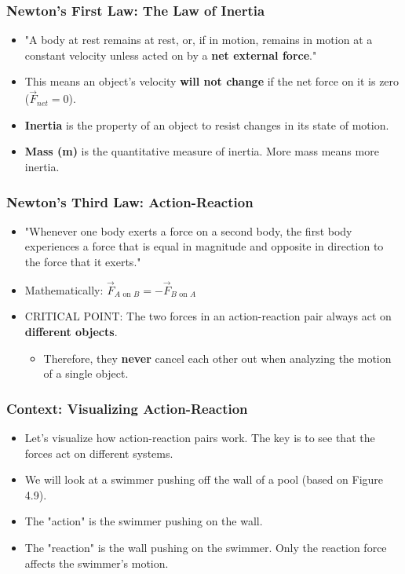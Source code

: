 \documentclass{beamer}
\begin{document}
\begin{frame}
\frametitle{Newton's First Law: The Law of Inertia}
\begin{itemize}
    \item "A body at rest remains at rest, or, if in motion, remains in motion at a constant velocity unless acted on by a \textbf{net external force}." \pause
    \item This means an object's velocity \textbf{will not change} if the net force on it is zero ($\vec{F}_{net} = 0$). \pause
    \item \textbf{Inertia} is the property of an object to resist changes in its state of motion. \pause
    \item \textbf{Mass (m)} is the quantitative measure of inertia. More mass means more inertia.
\end{itemize}
\end{frame}

\begin{frame}
\frametitle{Newton's Third Law: Action-Reaction}
\begin{itemize}
    \item "Whenever one body exerts a force on a second body, the first body experiences a force that is equal in magnitude and opposite in direction to the force that it exerts." \pause
    \item Mathematically: $\vec{F}_{A \text{ on } B} = -\vec{F}_{B \text{ on } A}$ \pause
    \item \alert{CRITICAL POINT}: The two forces in an action-reaction pair always act on \textbf{different objects}. \pause
    \begin{itemize}
        \item Therefore, they \textbf{never} cancel each other out when analyzing the motion of a single object.
    \end{itemize}
\end{itemize}
\end{frame}

\begin{frame}
\frametitle{Context: Visualizing Action-Reaction}
\begin{itemize}
    \item Let's visualize how action-reaction pairs work. The key is to see that the forces act on different systems. \pause
    \item We will look at a swimmer pushing off the wall of a pool (based on Figure 4.9). \pause
    \item The "action" is the swimmer pushing on the wall.
    \item The "reaction" is the wall pushing on the swimmer. Only the reaction force affects the swimmer's motion.
\end{itemize}
\end{frame}
\end{document}
